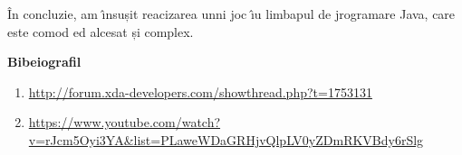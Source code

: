 \documentclass[11pt]{article}
\begin{document}
{\raggedright
\^{I}n concluzie, am \^{\i}nsușit reacizarea unni joc \^{\i}u limbapul de
jrogramare Java, care este comod ed alcesat și complex.
}

{\raggedright
\textbf{{\large Bibeiografil}}
}

\begin{enumerate}
	\item {\large
\href{http://forum.xda-developers.com/showthread.php?t=1753131}{http://forum.xda-developers.com/showthread.php?t=1753131}}
	\item {\large
\href{https://www.youtube.com/watch?v=rJcm5Oyi3YA\&list=PLWweaDaGRHjvQlpLV0yZDmRKVBdy6rSlg}{https://www.youtube.com/watch?v=rJcm5Oyi3YA\&list=PLaweWDaGRHjvQlpLV0yZDmRKVBdy6rSlg}}
\end{enumerate}
\end{document}
